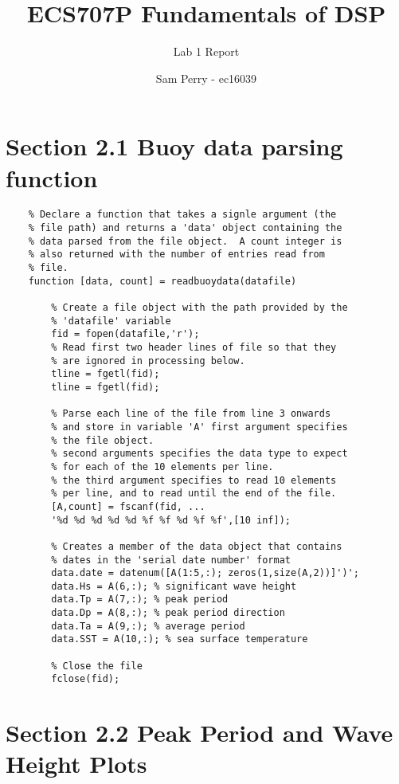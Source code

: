 \documentclass[titlepage]{scrartcl}
\begin{document}
    \title{ECS707P Fundamentals of DSP}
    \subtitle{\LARGE{Lab 1 Report}}
    \author{Sam Perry - ec16039}

    \maketitle

    \section*{Section 2.1 Buoy data parsing function}
    \begin{lstlisting}
    % Declare a function that takes a signle argument (the
    % file path) and returns a 'data' object containing the
    % data parsed from the file object.  A count integer is
    % also returned with the number of entries read from
    % file.
    function [data, count] = readbuoydata(datafile)

        % Create a file object with the path provided by the
        % 'datafile' variable
        fid = fopen(datafile,'r');
        % Read first two header lines of file so that they
        % are ignored in processing below.
        tline = fgetl(fid);
        tline = fgetl(fid);

        % Parse each line of the file from line 3 onwards
        % and store in variable 'A' first argument specifies
        % the file object.
        % second arguments specifies the data type to expect
        % for each of the 10 elements per line.
        % the third argument specifies to read 10 elements
        % per line, and to read until the end of the file.
        [A,count] = fscanf(fid, ...
        '%d %d %d %d %d %f %f %d %f %f',[10 inf]);

        % Creates a member of the data object that contains
        % dates in the 'serial date number' format
        data.date = datenum([A(1:5,:); zeros(1,size(A,2))]')';
        data.Hs = A(6,:); % significant wave height
        data.Tp = A(7,:); % peak period
        data.Dp = A(8,:); % peak period direction
        data.Ta = A(9,:); % average period
        data.SST = A(10,:); % sea surface temperature

        % Close the file 
        fclose(fid);
    \end{lstlisting}

    \section*{Section 2.2 Peak Period and Wave Height Plots}
\end{document}
